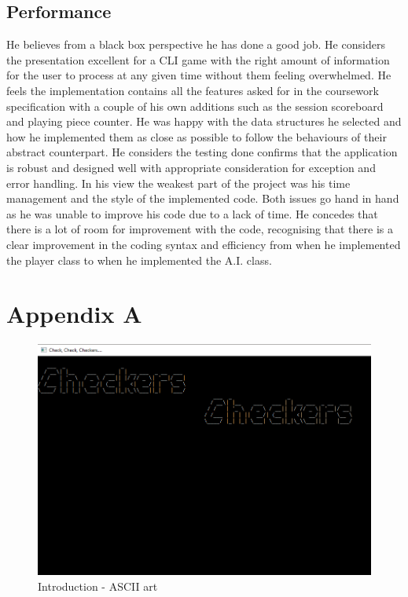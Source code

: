 \documentclass[10pt, a4paper]{article}
\begin{document}
 \subsection{Performance}
 He believes from a black box perspective he has done a good job. He considers the presentation excellent for a CLI game with the right amount of information for the user to process at any given time without them feeling overwhelmed. He feels the implementation contains all the features asked for in the coursework specification with a couple of his own additions such as the session scoreboard and playing piece counter.
 \newline
 He was happy with the data structures he selected and how he implemented them as close as possible to follow the behaviours of their abstract counterpart.
 \newline
 He considers the testing done confirms that the application is robust and designed well with appropriate consideration for exception and error handling.
 \newline
 In his view the weakest part of the project was his time management and the style of the implemented code. Both issues go hand in hand as he was unable to improve his code due to a lack of time. He concedes that there is a lot of room for improvement with the code, recognising that there is a clear improvement in the coding syntax and efficiency from when he implemented the player class to when he implemented the A.I. class.
 
 
 
   






\onecolumn


 \newpage
	
	 

 	\appendix
 
 \newpage
 \section{Appendix A}
 \label{appendix:a}
 \begin{figure}[H]
 	\centering 	
 	\includegraphics[scale=0.8]{Intro}
 	\caption{Introduction - ASCII art}		
 \end{figure}
 \newpage
\end{document}
